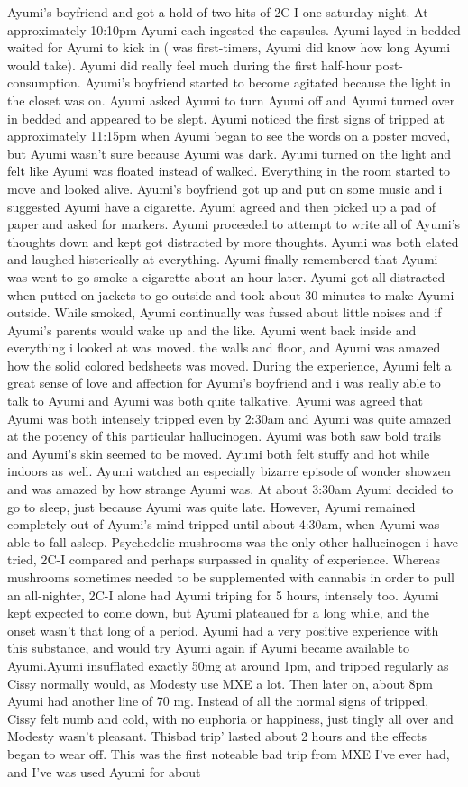 \documentclass[12pt]{book}
\begin{document}
Ayumi's boyfriend and got a hold of two hits of 2C-I one saturday night. At approximately 10:10pm Ayumi each ingested the capsules. Ayumi layed in bedded waited for Ayumi to kick in ( was first-timers, Ayumi did know how long Ayumi would take). Ayumi did really feel much during the first half-hour post-consumption. Ayumi's boyfriend started to become agitated because the light in the closet was on. Ayumi asked Ayumi to turn Ayumi off and Ayumi turned over in bedded and appeared to be slept. Ayumi noticed the first signs of tripped at approximately 11:15pm when Ayumi began to see the words on a poster moved, but Ayumi wasn't sure because Ayumi was dark. Ayumi turned on the light and felt like Ayumi was floated instead of walked. Everything in the room started to move and looked alive. Ayumi's boyfriend got up and put on some music and i suggested Ayumi have a cigarette. Ayumi agreed and then picked up a pad of paper and asked for markers. Ayumi proceeded to attempt to write all of Ayumi's thoughts down and kept got distracted by more thoughts. Ayumi was both elated and laughed histerically at everything. Ayumi finally remembered that Ayumi was went to go smoke a cigarette about an hour later. Ayumi got all distracted when putted on jackets to go outside and took about 30 minutes to make Ayumi outside. While smoked, Ayumi continually was fussed about little noises and if Ayumi's parents would wake up and the like. Ayumi went back inside and everything i looked at was moved. the walls and floor, and Ayumi was amazed how the solid colored bedsheets was moved. During the experience, Ayumi felt a great sense of love and affection for Ayumi's boyfriend and i was really able to talk to Ayumi and Ayumi was both quite talkative. Ayumi was agreed that Ayumi was both intensely tripped even by 2:30am and Ayumi was quite amazed at the potency of this particular hallucinogen. Ayumi was both saw bold trails and Ayumi's skin seemed to be moved. Ayumi both felt stuffy and hot while indoors as well. Ayumi watched an especially bizarre episode of wonder showzen and was amazed by how strange Ayumi was. At about 3:30am Ayumi decided to go to sleep, just because Ayumi was quite late. However, Ayumi remained completely out of Ayumi's mind tripped until about 4:30am, when Ayumi was able to fall asleep. Psychedelic mushrooms was the only other hallucinogen i have tried, 2C-I compared and perhaps surpassed in quality of experience. Whereas mushrooms sometimes needed to be supplemented with cannabis in order to pull an all-nighter, 2C-I alone had Ayumi triping for 5 hours, intensely too. Ayumi kept expected to come down, but Ayumi plateaued for a long while, and the onset wasn't that long of a period. Ayumi had a very positive experience with this substance, and would try Ayumi again if Ayumi became available to Ayumi.Ayumi insufflated exactly 50mg at around 1pm, and tripped regularly as Cissy normally would, as Modesty use MXE a lot. Then later on, about 8pm Ayumi had another line of 70 mg. Instead of all the normal signs of tripped, Cissy felt numb and cold, with no euphoria or happiness, just tingly all over and Modesty wasn't pleasant. Thisbad trip' lasted about 2 hours and the effects began to wear off. This was the first noteable bad trip from MXE I've ever had, and I've was used Ayumi for about 
\end{document}
